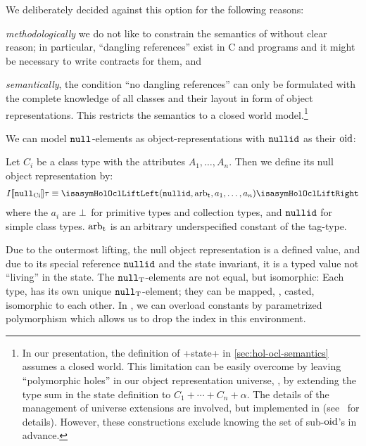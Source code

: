 We deliberately decided against this option for the following reasons:
\begin{compactenum}
\item \emph{methodologically} we do not like to constrain the semantics of \OCL
  without clear reason; in particular, ``dangling references'' exist in C and
  \Cpp{} programs and it might be necessary to write contracts for them, and
\item \emph{semantically}, the condition ``no dangling references'' can only be
  formulated with the complete knowledge of all classes and their layout in
  form of object representations.  This restricts the \OCL semantics to a closed
  world model.\footnote{In our presentation, the definition of \inlineocl+state+
    in \autoref{sec:hol-ocl-semantics} assumes a closed world. This limitation
    can be easily overcome by leaving ``polymorphic holes'' in our object
    representation universe, \ie, by extending the type sum in the state
    definition to $C_1 + \cdots + C_n + \alpha$.  The details of the management
    of universe extensions are involved, but implemented in \holocl
    (see~\cite{brucker.ea:extensible:2008-b} for details). However, these
    constructions exclude knowing the set of sub-$\mathrm{oid}$'s in advance.}
\end{compactenum} We can model ${\mathtt{null}_\text{{}}}$-elements as object-representations
with $\mathtt{nullid}$ as their $\mathrm{oid}$:
\begin{definition}
  Let $C_i$ be a class type with the attributes $A_1, \ldots, A_n$. Then we
  define its null object representation by:
  \begin{gather*}
    I\semantics{\Null{Ci}}\tau \equiv \lift{(\nullid, \Tag{arb}, a_1, \ldots,
    a_n )}
  \end{gather*}
  where the $a_i$ are $\bot$ for primitive types and collection
  types, and $\mathtt{nullid}$ for simple class types. $\mathrm{arb}_{\text{t}}$ is an arbitrary
  underspecified constant of the tag-type.
\end{definition}

Due to the outermost lifting, the null object representation is a defined value,
and due to its special reference $\mathtt{nullid}$ and the state invariant, it is a
typed value not ``living'' in the state.  The ${\mathtt{null}_\text{{T}}}$-elements are not equal,
but isomorphic: Each type, has its own unique ${\mathtt{null}_\text{{T}}}$-element; they can be
mapped, \ie, casted, isomorphic to each other. In \holocl, we can overload
constants by parametrized polymorphism which allows us to drop the index in this
environment.

